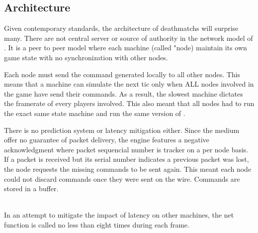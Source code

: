 \subsection{Architecture}
Given contemporary standards, the architecture of deathmatchs will surprise many. There are not central server or source of authority in the network model of \doom. It is a peer to peer model where each machine (called "node) maintain its own game state with no synchronization with other nodes.\\
\par
{}
\par
 Each node must send the command generated locally to all other nodes. This means that a machine can simulate the next tic only when ALL nodes involved in the game have send their commands. As a result, the slowest machine dictates the framerate of every players involved. This also meant that all nodes had to run the exact same state machine and run the same version of \doom.\\
\par
There is no prediction system or latency mitigation either. Since the medium offer no guarantee of packet delivery, the engine features a negative acknowledgment where packet sequencial number is tracker on a per node basis. If a packet is received but its serial number indicates a previous packet was lost, the node requests the missing commands to be sent again. This meant each node could not discard commands once they were sent on the wire. Commands are stored in a buffer.\\
\\
\par
In an attempt to mitigate the impact of latency on other machines, the net function  is called no less than eight times during each frame.\\
\par
